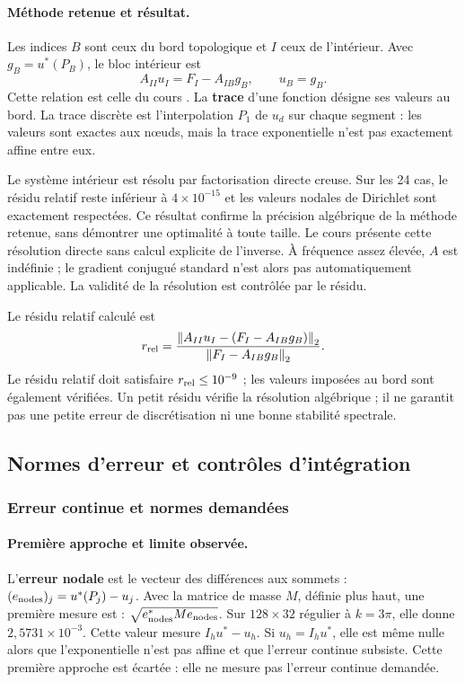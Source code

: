 \documentclass[12pt,a4paper]{article}
\newcommand{\norm}[1]{\left\lVert#1\right\rVert}
\begin{document}
\paragraph{Méthode retenue et résultat.}
Les indices $B$ sont ceux du bord topologique et $I$ ceux de l'intérieur. Avec $g_B=u^*(P_B)$, le bloc intérieur est
\begin{equation*}
A_{II}u_I=F_I-A_{IB}g_B,\qquad u_B=g_B.
\end{equation*}
Cette relation est celle du cours \cite{fem}. La \textbf{trace} d’une fonction désigne ses valeurs au bord. La trace discrète est l'interpolation $P_1$ de $u_d$ sur chaque segment : les valeurs sont exactes aux nœuds, mais la trace exponentielle n'est pas exactement affine entre eux.

Le système intérieur est résolu par factorisation directe creuse. Sur les 24 cas, le résidu relatif reste inférieur à $4\times10^{-15}$ et les valeurs nodales de Dirichlet sont exactement respectées. Ce résultat confirme la précision algébrique de la méthode retenue, sans démontrer une optimalité à toute taille. Le cours \cite{linear} présente cette résolution directe sans calcul explicite de l’inverse. À fréquence assez élevée, $A$ est indéfinie ; le gradient conjugué standard n'est alors pas automatiquement applicable. La validité de la résolution est contrôlée par le résidu.

Le résidu relatif calculé est
\begin{equation*}
r_{\rm rel}=\frac{\norm{A_{II}u_I-(F_I-A_{IB}g_B)}_2}
{\norm{F_I-A_{IB}g_B}_2}.
\end{equation*}
Le résidu relatif doit satisfaire $r_{\rm rel}\leq10^{-9}$ ; les valeurs imposées au bord sont également vérifiées. Un petit résidu vérifie la résolution algébrique ; il ne garantit pas une petite erreur de discrétisation ni une bonne stabilité spectrale.

\subsection{Normes d'erreur et contrôles d'intégration}
\subsubsection{Erreur continue et normes demandées}
\paragraph{Première approche et limite observée.}
L'\textbf{erreur nodale} est le vecteur des différences aux sommets : $(e_{\rm nodes})_j=u^*(P_j)-u_j$. Avec la matrice de masse $M$, définie plus haut, une première mesure est : $\sqrt{e_{\rm nodes}^*Me_{\rm nodes}}$. Sur $128\times32$ régulier à $k=3\pi$, elle donne $2,5731\times10^{-3}$. Cette valeur mesure $I_hu^*-u_h$. Si $u_h=I_hu^*$, elle est même nulle alors que l'exponentielle n'est pas affine et que l'erreur continue subsiste. Cette première approche est écartée : elle ne mesure pas l’erreur continue demandée.
\end{document}
